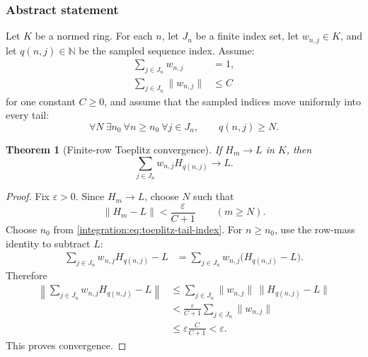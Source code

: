 \documentclass[11pt,oneside]{article}
\newtheorem{theorem}{Theorem}[section]
\theoremstyle{definition}
\theoremstyle{remark}
\newcommand{\N}{\mathbb N}
\begin{document}
\subsubsection{Abstract statement}

Let $K$ be a normed ring.  For each $n$, let $J_n$ be a finite index set, let
$w_{n,j}\in K$, and let $q(n,j)\in\N$ be the sampled sequence index.  Assume:
\begin{align}
 \sum_{j\in J_n}w_{n,j}&=1,                                \label{integration:eq:toeplitz-row-mass}\\
 \sum_{j\in J_n}\|w_{n,j}\|&\le C                         \label{integration:eq:toeplitz-variation}
\end{align}
for one constant $C\ge0$, and assume that the sampled indices move uniformly into every
tail:
\begin{equation}
 \forall N\ \exists n_0\ \forall n\ge n_0\ \forall j\in J_n,
 \qquad q(n,j)\ge N.
 \label{integration:eq:toeplitz-tail-index}
\end{equation}

\begin{theorem}[Finite-row Toeplitz convergence]
\label{integration:thm:finite-row-toeplitz}
If $H_m\to L$ in $K$, then
\begin{equation}
 \sum_{j\in J_n}w_{n,j}H_{q(n,j)}\longrightarrow L.
 \label{integration:eq:finite-row-toeplitz}
\end{equation}
\end{theorem}

\begin{proof}
Fix $\varepsilon>0$.  Since $H_m\to L$, choose $N$ such that
\begin{equation}
 \|H_m-L\|<\frac{\varepsilon}{C+1}
 \qquad(m\ge N).
 \label{integration:eq:toeplitz-tail-error}
\end{equation}
Choose $n_0$ from \eqref{integration:eq:toeplitz-tail-index}.  For $n\ge n_0$, use the row-mass identity
to subtract $L$:
\begin{align*}
 \sum_{j\in J_n}w_{n,j}H_{q(n,j)}-L
 &=\sum_{j\in J_n}w_{n,j}\bigl(H_{q(n,j)}-L\bigr).
\end{align*}
Therefore
\begin{align*}
 \left\|\sum_{j\in J_n}w_{n,j}H_{q(n,j)}-L\right\|
 &\le\sum_{j\in J_n}\|w_{n,j}\|\,\|H_{q(n,j)}-L\|\\
 &<\frac{\varepsilon}{C+1}\sum_{j\in J_n}\|w_{n,j}\|\\
 &\le\varepsilon\frac{C}{C+1}<\varepsilon.
\end{align*}
This proves convergence.
\end{proof}
\end{document}
